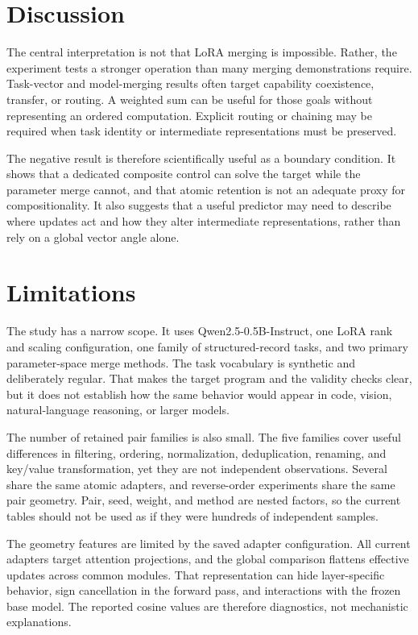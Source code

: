 \documentclass[10pt,twocolumn]{article}
\begin{document}
\section{Discussion}

The central interpretation is not that LoRA merging is impossible. Rather, the experiment tests a stronger operation than many merging demonstrations require. Task-vector and model-merging results often target capability coexistence, transfer, or routing. A weighted sum can be useful for those goals without representing an ordered computation. Explicit routing or chaining may be required when task identity or intermediate representations must be preserved.

The negative result is therefore scientifically useful as a boundary condition. It shows that a dedicated composite control can solve the target while the parameter merge cannot, and that atomic retention is not an adequate proxy for compositionality. It also suggests that a useful predictor may need to describe where updates act and how they alter intermediate representations, rather than rely on a global vector angle alone.

\section{Limitations}

The study has a narrow scope. It uses Qwen2.5-0.5B-Instruct, one LoRA rank and scaling configuration, one family of structured-record tasks, and two primary parameter-space merge methods. The task vocabulary is synthetic and deliberately regular. That makes the target program and the validity checks clear, but it does not establish how the same behavior would appear in code, vision, natural-language reasoning, or larger models.

The number of retained pair families is also small. The five families cover useful differences in filtering, ordering, normalization, deduplication, renaming, and key/value transformation, yet they are not independent observations. Several share the same atomic adapters, and reverse-order experiments share the same pair geometry. Pair, seed, weight, and method are nested factors, so the current tables should not be used as if they were hundreds of independent samples.

The geometry features are limited by the saved adapter configuration. All current adapters target attention projections, and the global comparison flattens effective updates across common modules. That representation can hide layer-specific behavior, sign cancellation in the forward pass, and interactions with the frozen base model. The reported cosine values are therefore diagnostics, not mechanistic explanations.
\end{document}

